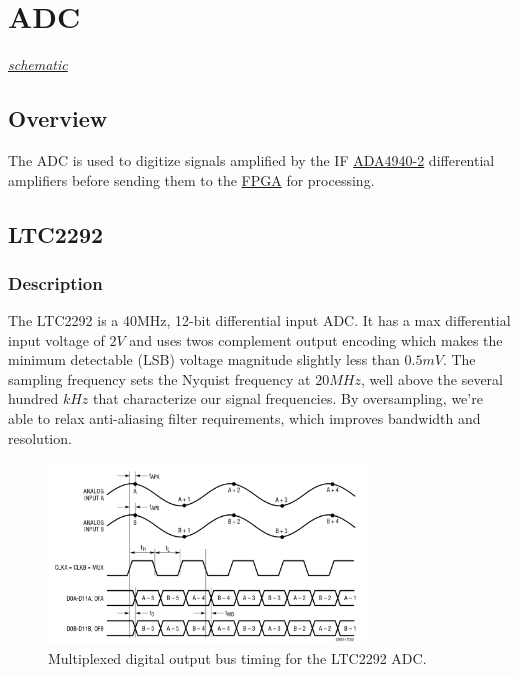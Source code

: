 \section{ADC}
\label{sec:adc}
\textit{\hyperlink{schematic.4}{schematic}}

\subsection{Overview}
\label{sec:adc-overview}

The ADC is used to digitize signals amplified by the IF \hyperref[sec:ada4940-2]{ADA4940-2}
differential amplifiers before sending them to the \hyperref[sec:xc7a15t-ftg256]{FPGA} for
processing.

\subsection{LTC2292}
\label{sec:ltc2292}

\subsubsection{Description}
\label{sec:ltc2292-description}

The LTC2292 is a 40MHz, 12-bit differential input ADC\@. It has a max differential input voltage of
$2 \si{V}$ and uses twos complement output encoding which makes the minimum detectable (LSB) voltage
magnitude slightly less than $0.5 \si{mV}$. The sampling frequency sets the Nyquist frequency at
$20 \si{MHz}$, well above the several hundred $\si{kHz}$ that characterize our signal
frequencies. By oversampling, we're able to relax anti-aliasing filter requirements, which improves
bandwidth and resolution.

\begin{figure}[h]
        \centering\includegraphics[width=0.75\textwidth]{data/LTC2292-multiplex.png}
        \caption{Multiplexed digital output bus timing for the LTC2292 ADC.}
        \label{fig:ltc2292-multiplex}
\end{figure}

